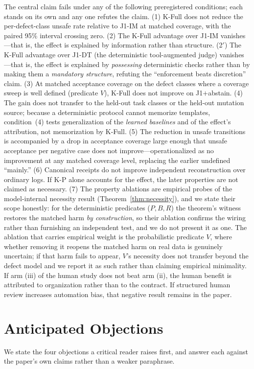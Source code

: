\documentclass[sigconf,anonymous,review]{acmart}
\begin{document}
The central claim fails under any of the following preregistered conditions; each stands on its own and any one refutes the claim. (1) K-Full does not reduce the per-defect-class unsafe rate relative to J1-IM at matched coverage, with the paired 95\% interval crossing zero. (2) The K-Full advantage over J1-IM vanishes---that is, the effect is explained by information rather than structure. (2$'$) The K-Full advantage over J1-DT (the deterministic tool-augmented judge) vanishes---that is, the effect is explained by \emph{possessing} deterministic checks rather than by making them a \emph{mandatory structure}, refuting the ``enforcement beats discretion'' claim. (3) At matched acceptance coverage on the defect classes where a coverage sweep is well defined (predicate $V$), K-Full does not improve on J1$+$abstain. (4) The gain does not transfer to the held-out task classes or the held-out mutation source; because a deterministic protocol cannot memorize templates, condition~(4) tests generalization of the \emph{learned baselines} and of the effect's attribution, not memorization by K-Full. (5) The reduction in unsafe transitions is accompanied by a drop in acceptance coverage large enough that unsafe acceptance per negative case does not improve---operationalized as no improvement at any matched coverage level, replacing the earlier undefined ``mainly.'' (6) Canonical receipts do not improve independent reconstruction over ordinary logs. If K-P alone accounts for the effect, the later properties are not claimed as necessary. (7) The property ablations are empirical probes of the model-internal necessity result (Theorem~\ref{thm:necessity}), and we state their scope honestly: for the deterministic predicates ($P,B,R$) the theorem's witness restores the matched harm \emph{by construction}, so their ablation confirms the wiring rather than furnishing an independent test, and we do not present it as one. The ablation that carries empirical weight is the probabilistic predicate $V$, where whether removing it reopens the matched harm on real data is genuinely uncertain; if that harm fails to appear, $V$'s necessity does not transfer beyond the defect model and we report it as such rather than claiming empirical minimality. If arm (iii) of the human study does not beat arm (ii), the human benefit is attributed to organization rather than to the contract. If structured human review increases automation bias, that negative result remains in the paper.

\section{Anticipated Objections}
\label{sec:objections}
We state the four objections a critical reader raises first, and answer each against the paper's own claims rather than a weaker paraphrase.
\end{document}
